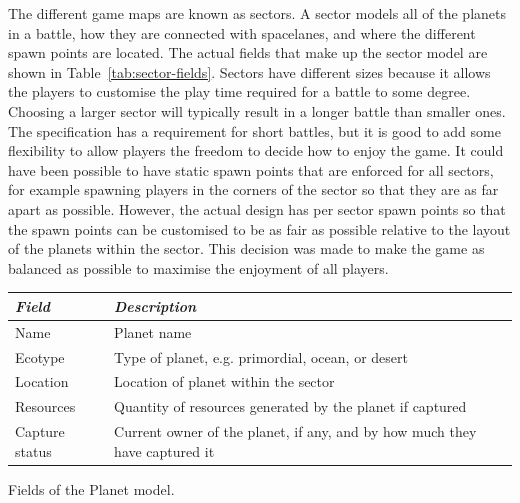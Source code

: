 The different game maps are known as sectors. A sector models all of the planets in a battle, how they are connected with spacelanes, and where the different spawn points are located. The actual fields that make up the sector model are shown in Table~\ref{tab:sector-fields}. Sectors have different sizes because it allows the players to customise the play time required for a battle to some degree. Choosing a larger sector will typically result in a longer battle than smaller ones. The specification has a requirement for short battles, but it is good to add some flexibility to allow players the freedom to decide how to enjoy the game. It could have been possible to have static spawn points that are enforced for all sectors, for example spawning players in the corners of the sector so that they are as far apart as possible. However, the actual design has per sector spawn points so that the spawn points can be customised to be as fair as possible relative to the layout of the planets within the sector. This decision was made to make the game as balanced as possible to maximise the enjoyment of all players.



\begin{margintable}
    \begin{tabular}{p{4em} p{11em}}
    \toprule
    \emph{Field} & \emph{Description} \\
    \midrule
    Name & Planet name \\
    Ecotype & Type of planet, e.g. primordial, ocean, or desert \\
    Location & Location of planet within the sector \\
    Resources & Quantity of resources generated by the planet if captured \\
    Capture status & Current owner of the planet, if any, and by how much they have captured it \\
    \bottomrule
    \end{tabular}
    \vspace{1em}
    \caption[Fields of the Planet model]{Fields of the Planet model.}
    \label{tab:planet-fields}
\end{margintable}

